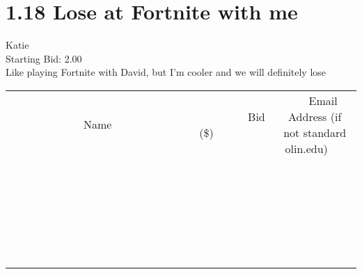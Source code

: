 \documentclass[11pt]{article}
\begin{document}
					\section*{1.18 Lose at Fortnite with me}
					Katie \\
					Starting Bid: 2.00 \\
					Like playing Fortnite with David, but I'm cooler and we will definitely lose \\
					[6ex]
					\begin{tabular}{c c c}
						~~~~~~~~~~~~~Name~~~~~~~~~~~~~ & ~~~~~~~~~Bid (\$)~~~~~~~~~ & ~~~Email Address (if not standard olin.edu)~~~ \\
				
 & & \\
\hline
 & & \\
\hline
 & & \\
\hline
 & & \\
\hline
 & & \\
\hline
 & & \\
\hline
 & & \\
\hline
 & & \\
\hline
 & & \\
\hline
 & & \\
\hline
 & & \\
\hline
 & & \\
\hline
 & & \\
\hline
 & & \\
\hline
 & & \\
\hline
 & & \\
\hline
 & & \\
\hline
 & & \\
\hline
 & & \\
\hline
 & & \\
\hline
 & & \\
\hline
 & & \\
\hline
 & & \\
\hline
 & & \\
\hline
 & & \\
\hline
 & & \\
\hline
					\end{tabular}
					\clearpage
				
\end{document}
